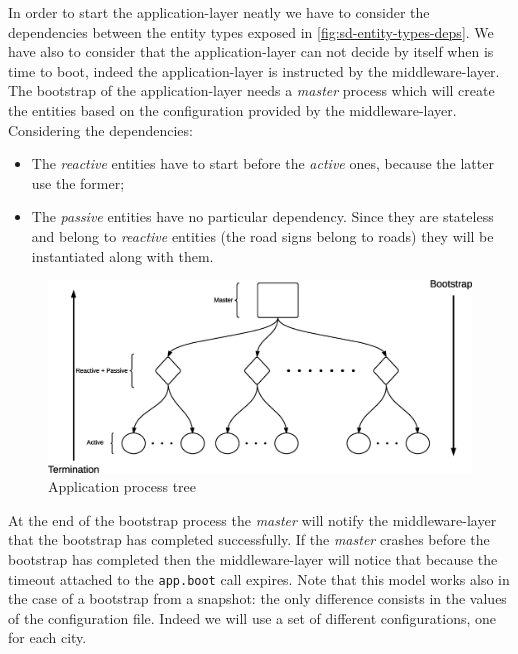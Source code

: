 In order to start the application-layer neatly we have to consider the 
dependencies between the entity types exposed in \ref{fig:sd-entity-types-deps}. 
We have also to consider that the application-layer can not decide by itself 
when is time to boot, indeed the application-layer is instructed by the 
middleware-layer. The bootstrap of the application-layer needs a \textit{master} 
process which will create the entities based on the configuration provided by 
the middleware-layer. Considering the dependencies:
\begin{itemize}
  \item The \textit{reactive} entities have to start before the \textit{active} 
ones, because the latter use the former; 
  \item The \textit{passive} entities have no particular dependency. Since 
they are stateless and belong to \textit{reactive} entities (the road signs 
belong to roads) they will be instantiated along with them.
\end{itemize}

\begin{figure}[H]
  \centering
  \includegraphics[width=\columnwidth]{sections/images/solution/app_proc_tree.eps}
  \caption{Application process tree}
  \label{fig:app-proc-tree}
\end{figure}

At the end of the bootstrap process the \textit{master} will notify the 
middleware-layer that the bootstrap has completed successfully. If the 
\textit{master} crashes before the bootstrap has completed then 
the middleware-layer will notice that because the timeout 
attached to the \texttt{app.boot} call expires. Note that this model works also
in the case of a bootstrap from a snapshot: the only difference consists in the
values of the configuration file. Indeed we will use a set of different 
configurations, one for each city.


